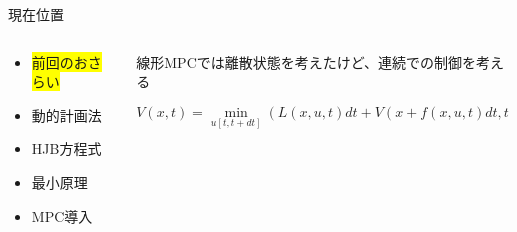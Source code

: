 \documentclass[dvipdfmx,12pt]{beamer}
\begin{document}
    \begin{frame}{現在位置}
        \footnotesize
        \begin{columns}
            \begin{column}{.35\textwidth}
                \begin{itemize}
                    \item \colorbox{yellow}{前回のおさらい}
                    \item 動的計画法
                    \item HJB方程式
                    \item 最小原理
                    \item MPC導入
                \end{itemize}
            \end{column}
    
            \begin{column}{.7\textwidth}
                線形MPCでは離散状態を考えたけど、連続での制御を考える \\
                \fontsize{6.5pt}{3.5pt}\selectfont
                \begin{tcolorbox}[title=Bellman方程式]
                    \begin{equation*}
                        V(x, t) = \min_{u[t, t+dt]} \left( L(x, u, t) dt + V \left( x + f(x, u, t) dt, t + dt \right) \right)
                    \end{equation*}
                \end{tcolorbox}
                
            \end{column}
        \end{columns}
    \end{frame}
\end{document}
